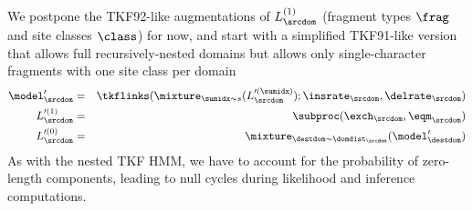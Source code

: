 We postpone the TKF92-like augmentations of $L^{(1)}_\srcdom$ (fragment types $\frag$ and site classes $\class$) for now, and start with a simplified TKF91-like version
that allows full recursively-nested domains but allows only single-character fragments with one site class per domain
\begin{eqnarray*}
\model'_\srcdom & = &
\tkflinks(\mixture_{\sumidx\sim\tok}(L'^{(\sumidx)}_\srcdom);\insrate_\srcdom,\delrate_\srcdom)
\\
L'^{(1)}_\srcdom & = & \subproc(\exch_\srcdom,\eqm_\srcdom) \\
L'^{(0)}_\srcdom & = & \mixture_{\destdom\sim\domdist_\srcdom}(\model'_\destdom)
\end{eqnarray*}
As with the nested TKF HMM, we have to account for the probability of zero-length components, leading to null cycles during likelihood and inference computations.

